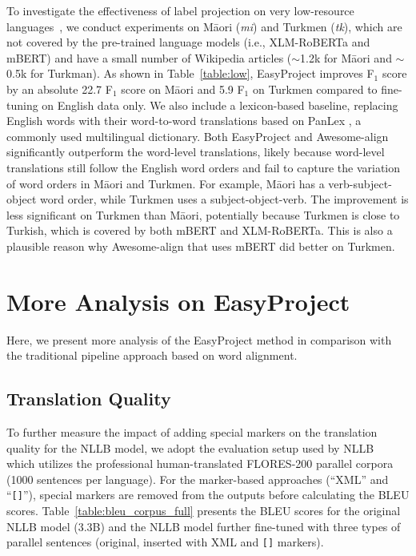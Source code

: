 \documentclass[11pt,dvipsnames]{article}
\begin{document}
To investigate the effectiveness of label projection on very low-resource languages~\citep{pfeiffer2020madx}, we conduct experiments on M\=aori (\textit{mi}) and Turkmen (\textit{tk}), which are not covered by the pre-trained language models (i.e., XLM-RoBERTa and mBERT) and have a small number of Wikipedia articles ($\sim$1.2k for M\=aori and $\sim$0.5k for Turkman). 
As shown in Table~\ref{table:low}, EasyProject improves F$_1$ score by an absolute 22.7 F$_1$ score on M\=aori and 5.9 F$_1$ on Turkmen compared to fine-tuning  on English data only. 
We also include a lexicon-based baseline, replacing English words with their word-to-word translations based on PanLex \cite{kamholz-etal-2014-panlex}, a commonly used multilingual dictionary. 
Both EasyProject and Awesome-align significantly outperform the word-level translations, likely because word-level translations still follow the English word orders and fail to capture the variation of word orders in M\=aori and Turkmen. 
For example, M\=aori has a verb-subject-object word order, while Turkmen uses a subject-object-verb. 
The improvement is less significant on Turkmen than M\=aori, potentially because Turkmen is close to Turkish, which is covered by both mBERT and XLM-RoBERTa. 
This is also a plausible reason why Awesome-align that uses mBERT did better on Turkmen. 




\section{More  Analysis on EasyProject}
\label{appendix:translation-evaluation}
Here, we present more analysis of the EasyProject method in comparison with the traditional  pipeline approach based on word alignment.
\subsection{Translation Quality}
\label{appendix:translation-quality-evaluation}











To further measure the impact of adding special markers on the translation quality for the NLLB model, we adopt the evaluation setup used by NLLB~\citep{nllb2022} which utilizes the professional human-translated FLORES-200 parallel corpora (1000 sentences per language).
For the  marker-based approaches (``XML'' and ``{\tt []}''),  special markers are removed from the outputs before calculating the BLEU scores.  Table~\ref{table:bleu_corpus_full} presents the BLEU scores for the original NLLB model (3.3B) and the  NLLB model further fine-tuned with three types of parallel sentences (original, inserted with XML and {\tt []} markers).
\end{document}
